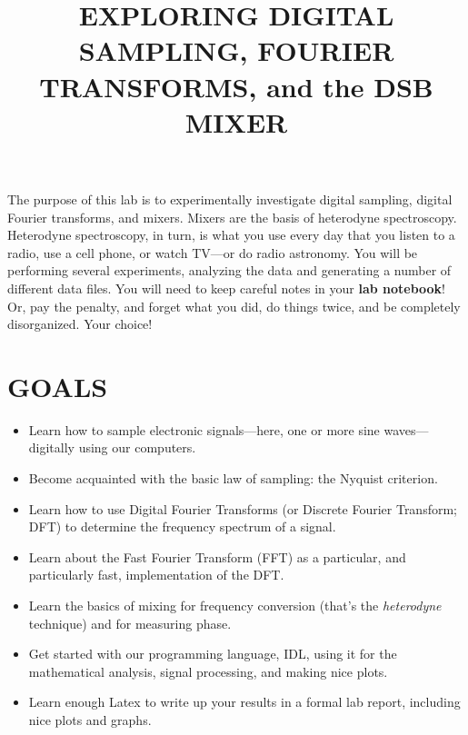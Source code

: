 \documentclass[11pt,preprint]{aastex}
\begin{document}
\def\simlt{\lower.5ex\hbox{$\; \buildrel < \over \sim \;$}}
\def\simgt{\lower.5ex\hbox{$\; \buildrel > \over \sim \;$}}

\title {EXPLORING DIGITAL SAMPLING, FOURIER TRANSFORMS, and the DSB MIXER}

\tableofcontents

	The purpose of this lab is to experimentally investigate digital
sampling, digital Fourier transforms, and mixers. Mixers are the basis
of heterodyne spectroscopy. Heterodyne spectroscopy, in turn, is what you
use every day that you listen to a radio, use a cell phone, or watch
TV---or do radio astronomy. You will be performing several experiments,
analyzing the data and generating a number of
different data files. You will need to keep careful notes in your {\bf
lab notebook}! Or, pay the penalty, and forget what you did, do things
twice, and be completely disorganized. Your choice!

\section{GOALS}

\begin{itemize}

\item Learn how to sample electronic signals---here, one or more sine
  waves---digitally using our computers.

\item Become acquainted with the basic law of sampling: the Nyquist
  criterion.

\item Learn how to use Digital Fourier Transforms (or Discrete Fourier
  Transform; DFT) to determine the
  frequency spectrum of a signal.

\item Learn about the Fast Fourier Transform (FFT) as a particular, and
  particularly fast, implementation of the DFT.

\item Learn the basics of mixing for frequency conversion (that's
  the {\it heterodyne} technique) and for measuring phase.

\item Get started with our programming language, IDL, using it for the
  mathematical analysis, signal processing, and making nice plots.

\item Learn enough Latex to write up your results in a formal lab report,
  including nice plots and graphs.

\end{itemize}
\end{document}
